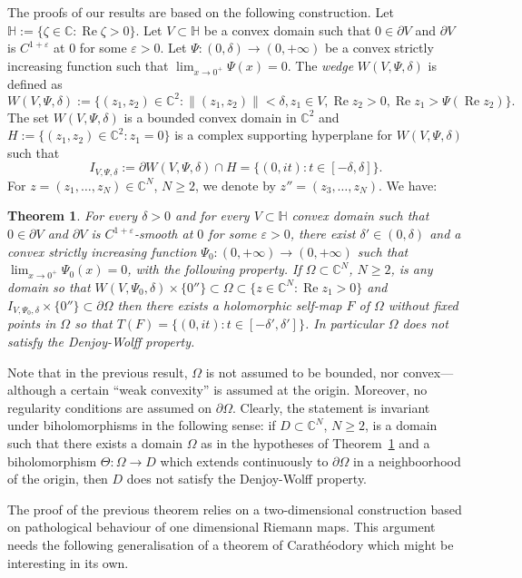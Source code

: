 \documentclass[12pt]{amsart}
\newtheorem{theorem}{Theorem}[section]
\theoremstyle{definition}
\theoremstyle{remark}
\numberwithin{equation}{section}
\def\C{\mathbb C}
\def\Ha{\mathbb H}
\renewcommand{\Re}{\operatorname{Re}}
\begin{document}
The proofs of our results are based on the following construction. Let $\Ha:=\{\zeta\in \C: \Re \zeta>0\}$. Let $V\subset \Ha$ be  a convex domain such that $0\in \partial V$ and $\partial V$ is $C^{1+\varepsilon}$ at $0$ for some $\varepsilon>0$. Let $\Psi:(0,\delta)\to (0,+\infty)$ be a convex strictly increasing function such that $\lim_{x\to 0^+} \Psi(x)=0$. The {\sl wedge} $W(V, \Psi,\delta)$ is defined as
\[
W(V,\Psi, \delta):=\{(z_1,z_2)\in\C^2: \|(z_1, z_2)\|<\delta, z_1 \in V, \Re z_2>0, \Re z_1>\Psi(\Re z_2)\}.  
\]
The set $W(V, \Psi,\delta)$ is a bounded convex domain in $\C^2$ and $H:=\{(z_1, z_2)\in \C^2:  z_1=0\}$ is a complex supporting hyperplane for $W(V, \Psi,\delta)$ such that 
\[
I_{V, \Psi,\delta}:=\partial W(V, \Psi, \delta)\cap H=\{(0, it):  t\in [-\delta,\delta]\}.
\]
    {For $z=(z_1,\ldots, z_N)\in \C^N$, $N\geq 2$, we denote by $z''=(z_3,\ldots, z_N)$}. We have:
\begin{theorem}\label{thm:main}
{For every $\delta>0$ and for every $V\subset \Ha$  convex domain such that $0\in \partial V$ and $\partial V$ is $C^{1+\varepsilon}$-smooth at $0$ for some $\varepsilon>0$, there exist $\delta'\in(0,\delta)$ and a  convex strictly increasing function  $\Psi_0:(0,+\infty)\to (0,+\infty)$ such that $\lim_{x\to 0^+} \Psi_0(x)=0$, with the following property. If $\Omega\subset \C^N$, $N\geq 2$, is any  domain so that  $W(V, \Psi_0, \delta)\times\{0''\}\subset \Omega \subset \{z\in \mathbb{C}^N: \Re z_1> 0\}$ and $I_{V,\Psi_0,\delta}\times\{0''\}\subset \partial\Omega$ then there exists a holomorphic self-map $F$ of $\Omega$ without fixed points in $\Omega$ so that $T(F)=\{(0, it):  t\in [-\delta',\delta']\}$. In particular $\Omega$ does not satisfy the Denjoy-Wolff property.}
\end{theorem}

{Note that in the previous result, $\Omega$ is not assumed to be bounded, nor convex---although a certain ``weak convexity'' is assumed at the origin. Moreover, no regularity conditions are assumed on $\partial \Omega$. Clearly, the statement is invariant under biholomorphisms in the following sense: if $D\subset \C^N$, $N\geq 2$, is a domain such that there exists a domain $\Omega$ as in the hypotheses of Theorem~\ref{thm:main} and a biholomorphism $\Theta:\Omega\to D$ which extends continuously to $\partial \Omega$ in a neighboorhood of the origin, then $D$ does not satisfy the Denjoy-Wolff property.} 

{The proof of the previous theorem relies on a two-dimensional construction  based on pathological behaviour of one dimensional Riemann maps.  This argument  needs the following  generalisation of a theorem of Carath\'eodory which might be interesting in its own}.
\end{document}
